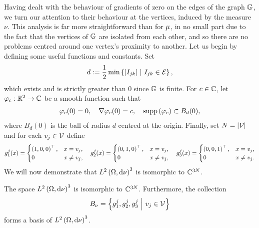 Having dealt with the behaviour of gradients of zero on the edges of the graph $\mathbb{G}$, we turn our attention to their behaviour at the vertices, induced by the measure $\nu$.
This analysis is far more straightforward than for $\mu$, in no small part due to the fact that the vertices of $\mathbb{G}$ are isolated from each other, and so there are no problems centred around one vertex's proximity to another.
Let us begin by defining some useful functions and constants.
Set 
\begin{align} \label{eq:HalfMinDistBetweenVertsDef}
	d := \frac{1}{2}\min\left\{ \left\lvert I_{jk} \right\rvert \ \middle\vert \  I_{jk}\in\mathcal{E} \right\},
\end{align}
which exists and is strictly greater than 0 since $\mathbb{G}$ is finite.
For $c\in\mathbb{C}$, let $\varphi_c:\mathbb{R}^2\rightarrow\mathbb{C}$ be a smooth function such that
\begin{align} \label{eq:NuSmoothVertexFunctionDef}
	\varphi_c(0) = 0, \quad
	\nabla\varphi_c(0) = c, \quad
	\mathrm{supp}\left( \varphi_c \right)\subset B_d(0),
\end{align}
where $B_d(0)$ is the ball of radius $d$ centred at the origin.
Finally, set $N = \left\lvert \mathcal{V} \right\rvert$ and for each $v_j\in\mathcal{V}$ define
\begin{align*}
	g_1^j(x) = \begin{cases} \left( 1,0,0 \right)^\top, & x=v_j, \\ 0 & x\neq v_j, \end{cases}
	\quad
	g_2^j(x) = \begin{cases} \left( 0,1,0 \right)^\top, & x=v_j, \\ 0 & x\neq v_j, \end{cases}
	\quad
	g_3^j(x) = \begin{cases} \left( 0,0,1 \right)^\top, & x=v_j, \\ 0 & x\neq v_j. \end{cases}
\end{align*}
We will now demonstrate that $L^{2}\left( \Omega,\mathrm{d}\nu \right)^3$ is isomorphic to $\mathbb{C}^{3N}$. 
\begin{lemma} \label{lem:L2nuIsomCN}
	The space $L^{2}\left( \Omega,\mathrm{d}\nu \right)^3$ is isomorphic to $\mathbb{C}^{3N}$.
	Furthermore, the collection 
	\begin{align*}
		B_{\nu} = \left\{ g_1^j, g_2^j, g_3^j \ \middle\vert \  v_j\in\mathcal{V} \right\}
	\end{align*} forms a basis of $L^{2}\left( \Omega,\mathrm{d}\nu \right)^3$.
\end{lemma}
